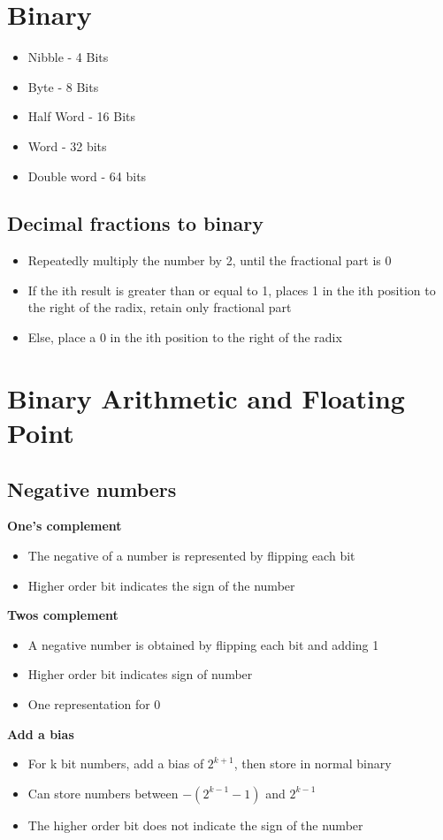 \documentclass{article}[18pt]
\begin{document}
\section{Binary}
\begin{itemize}
	\item Nibble - 4 Bits
	\item Byte - 8 Bits
	\item Half Word - 16 Bits
	\item Word - 32 bits
	\item Double word - 64 bits
\end{itemize}
\subsection{Decimal fractions to binary}
\begin{itemize}
	\item Repeatedly multiply the number by 2, until the fractional part is 0
	\item If the ith result is greater than or equal to 1, places 1 in the ith position to the right of the radix, retain only fractional part
	\item Else, place a 0 in the ith position to the right of the radix
\end{itemize}
\section{Binary Arithmetic and Floating Point}
\subsection{Negative numbers}
\textbf{One's complement}
\begin{itemize}
	\item The negative of a number is represented by flipping each bit
	\item Higher order bit indicates the sign of the number
\end{itemize}
\textbf{Twos complement}
\begin{itemize}
	\item A negative number is obtained by flipping each bit and adding 1
	\item Higher order bit indicates sign of number
	\item One representation for 0
\end{itemize}
\textbf{Add a bias}
\begin{itemize}
	\item For k bit numbers, add a bias of $2^{k+1}$, then store in normal binary
	\item Can store numbers between $-(2^{k-1}-1)$ and $2^{k-1}$
	\item The higher order bit does not indicate the sign of the number
\end{itemize}
\end{document}
